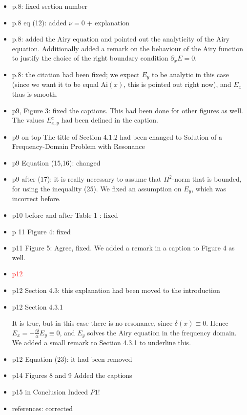 \documentclass[a4paper,10pt]{article}
\begin{document}
\begin{itemize}
 \item p.8: fixed section number
 
 \item p.8 eq (12): added $\nu=0$ + explanation
 
 \item p.8: added the Airy equation and pointed out the analyticity of the Airy equation. Additionally added a remark on the behaviour of the Airy function to justify the choice of the right boundary 
 condition $\partial_x E=0$. 
 
 \item p.8: the citation had been fixed; we expect $E_y$ to be analytic in this case (since we want it to be equal $\mathrm{Ai}(x)$, this is pointed out right now), 
 and $E_x$ thus is smooth.
 
 \item  p9, Figure 3: fixed the captions. This had been done for other figures as well. The values $E^{c}_{x,y}$ had been defined in the caption.
 
 \item p9 on top
  The title of Section 4.1.2 had been changed to Solution of a Frequency-Domain Problem with Resonance
  
 \item p9 Equation (15,16): changed  

 \item p9 after (17): it is really necessary to assume that $H^2$-norm that is bounded, for using the inequality (25). 
 We fixed an assumption on $E_y$, which was incorrect before.


  
 \item p10 before and after Table 1 : fixed
 
 \item p 11 Figure 4: fixed
 
 \item p11 Figure 5:
Agree, fixed. We added a remark in a caption to Figure 4 as well.


\item {\textcolor{red}{p12}}


\item p12 Section 4.3: this explanation had been moved to the introduction



\item p12 Section 4.3.1

  It is true, but in this case there is no resonance, since $\delta(x)\equiv 0$. Hence $E_x=-\frac{i\delta}{\alpha}E_y\equiv 0$, 
  and $E_y$ solves the Airy equation in the frequency domain. We added a small remark to Section 4.3.1 to underline this. 

  
\item p12 Equation (23): it had been removed
  
\item p14 Figures 8 and 9
Added the captions  


\item p15 in Conclusion
  Indeed $P1$!
  
\item references: corrected
  \end{itemize}
\end{document}
